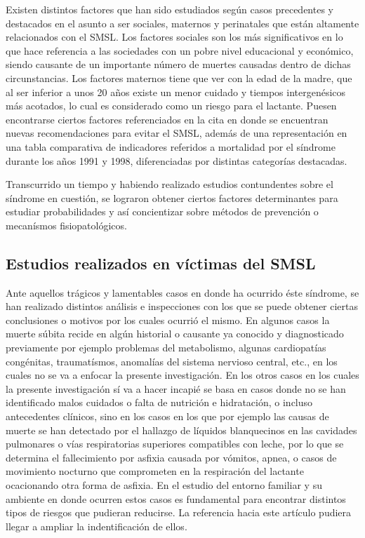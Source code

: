 \documentclass{IEEEtran}
\begin{document}
			Existen distintos factores que han sido estudiados según casos precedentes y destacados en el asunto a ser sociales, maternos y perinatales que están altamente relacionados con el SMSL. Los factores sociales son los más significativos en lo que hace referencia a las sociedades con un pobre nivel educacional y económico, siendo causante de un importante número de muertes causadas dentro de dichas circunstancias. Los factores maternos tiene que ver con la edad de la madre, que al ser inferior a unos 20 años existe un menor cuidado y tiempos intergenésicos más acotados, lo cual es considerado como un riesgo para el lactante. Puesen encontrarse ciertos factores referenciados en la cita \cite{subita2000nuevas} en donde se encuentran nuevas recomendaciones para evitar el SMSL, además de una representación en una tabla comparativa de indicadores referidos a mortalidad por el síndrome durante los años 1991 y 1998, diferenciadas por distintas categorías destacadas.

			Transcurrido un tiempo y habiendo realizado estudios contundentes sobre el síndrome en cuestión, se lograron obtener ciertos factores determinantes para estudiar probabilidades y así concientizar sobre métodos de prevención o mecanísmos fisiopatológicos. 

		\subsection{Estudios realizados en víctimas del SMSL}

			Ante aquellos trágicos y lamentables casos en donde ha ocurrido éste síndrome, se han realizado distintos análisis e inspecciones con los que se puede obtener ciertas conclusiones o motivos por los cuales ocurrió el mismo. En algunos casos la muerte súbita recide en algún historial o causante ya conocido y diagnosticado previamente por ejemplo problemas del metabolismo, algunas cardiopatías congénitas, traumatísmos, anomalías del sistema nervioso central, etc., en los cuales no se va a enfocar la presente investigación. En los otros casos en los cuales la presente investigación sí va a hacer incapié se basa en casos donde no se han identificado malos cuidados o falta de nutrición e hidratación, o incluso antecedentes clínicos, sino en los casos en los que por ejemplo las causas de muerte se han detectado por el hallazgo de líquidos blanquecinos en las cavidades pulmonares o vías respiratorias superiores compatibles con leche, por lo que se determina el fallecimiento por asfixia causada por vómitos, apnea, o casos de movimiento nocturno que comprometen en la respiración del lactante ocacionando otra forma de asfixia.
			En el estudio del entorno familiar y su ambiente en donde ocurren estos casos es fundamental para encontrar distintos tipos de riesgos que pudieran reducirse. La referencia hacia este artículo \cite{aguilera2002importancia} pudiera llegar a ampliar la indentificación de ellos.
\end{document}
